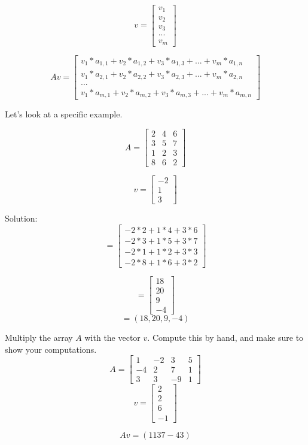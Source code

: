 $$v = \begin{bmatrix}
 v_{1}  \\
 v_{2} \\
 v_{3} \\
 ... \\
 v_{m} 
\end{bmatrix}$$

 $$Av =\begin{bmatrix}
 v_{1}*a_{1,1} +v_{2}*a_{1,2}  +v_{3}*a_{1,3} +... +v_{m}*a_{1,n}  \\
 v_{1}*a_{2,1} +v_{2}*a_{2,2}  +v_{3}*a_{2,3} +... +v_{m}*a_{2,n}  \\
 ... \\
 v_{1}*a_{m,1} +v_{2}*a_{m,2}  +v_{3}*a_{m,3} +... +v_{m}*a_{m,n}  
\end{bmatrix}$$

Let's look at a specific example.

$$A = \begin{bmatrix}
 2  & 4 & 6  \\
 3  & 5 & 7  \\
 1  & 2 & 3  \\
 8  & 6 & 2 
\end{bmatrix}$$

$$v = \begin{bmatrix}
 -2  \\
 1 \\
 3 
\end{bmatrix}$$

Solution:
$$= \begin{bmatrix}
-2*2+1*4+3*6\\
-2*3+1*5+3*7\\
 -2*1+1*2+3*3\\
-2*8+1*6+3*2
\end{bmatrix}$$

$$= \begin{bmatrix}
18 \\
20\\
9\\
-4 
\end{bmatrix}$$
$$= (18,20,9,-4)$$

\begin{Exercise}[title={Vector Matrix Multiplication}, label=vector-matrix-multiply01]
Multiply the array $A$ with the vector $v$. Compute this by hand, and make sure to show your computations. 
$$A = \begin{bmatrix}
1 & -2  & 3 & 5  \\
-4  & 2  & 7 & 1 \\
3  & 3  & -9 & 1
\end{bmatrix}$$
	$$v = 
	\begin{bmatrix}
		2 \\
 		2 \\
 		6 \\
 		-1
	\end{bmatrix}$$
\end{Exercise}
\begin{Answer}[ref=vector-matrix-multiply01]
$$Av = (11 37 -43)$$
\end{Answer}

